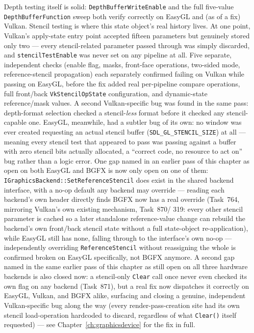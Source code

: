 Depth testing itself is solid: \texttt{DepthBufferWriteEnable} and the full five-value
\texttt{DepthBufferFunction} sweep both verify correctly on EasyGL and (as of a fix) Vulkan.
Stencil testing is where this state object's real history lives. At one point, Vulkan's
apply-state entry point accepted fifteen parameters but genuinely stored only two --- every
stencil-related parameter passed through was simply discarded, and \texttt{stencilTestEnable}
was never set on any pipeline at all. Five separate, independent checks (enable flag, masks,
front-face operations, two-sided mode, reference-stencil propagation) each separately
confirmed failing on Vulkan while passing on EasyGL, before the fix added real per-pipeline
compare operations, full front/back \texttt{VkStencilOpState} configuration, and dynamic-state
reference/mask values. A second Vulkan-specific bug was found in the same pass: depth-format
selection checked a stencil-\emph{less} format before it checked any stencil-capable one.
EasyGL, meanwhile, had a subtler bug of its own: no window was ever created requesting an
actual stencil buffer (\texttt{SDL\_GL\_STENCIL\_SIZE}) at all --- meaning every stencil test
that appeared to pass was passing against a buffer with zero stencil bits actually allocated,
a ``correct code, no resource to act on'' bug rather than a logic error. One gap named in an
earlier pass of this chapter as open on both EasyGL and BGFX is now only open on one of them:
\texttt{IGraphicsBackend::SetReferenceStencil} does exist in the shared backend interface, with
a no-op default any backend may override --- reading each backend's own header directly finds
BGFX now has a real override (Task~764, mirroring Vulkan's own existing mechanism, Task~870/%
319: every other stencil parameter is cached so a later standalone reference-value change can
rebuild the backend's own front/back stencil state without a full state-object
re-application), while EasyGL still has none, falling through to the interface's own no-op ---
independently overriding \texttt{ReferenceStencil} without reassigning the whole
 is confirmed broken on EasyGL specifically, not BGFX anymore. A
second gap named in the same earlier pass of this chapter as still open on all three hardware
backends is also closed now: a stencil-only \texttt{Clear} call once never even checked its
own flag on any backend (Task~871), but a real fix now dispatches it
correctly on EasyGL, Vulkan, and BGFX alike, surfacing and closing a genuine, independent
Vulkan-specific bug along the way (every render-pass-creation site had its own stencil
load-operation hardcoded to discard, regardless of what \texttt{Clear()} itself requested) ---
see Chapter~\ref{ch:graphicsdevice} for the fix in full.

